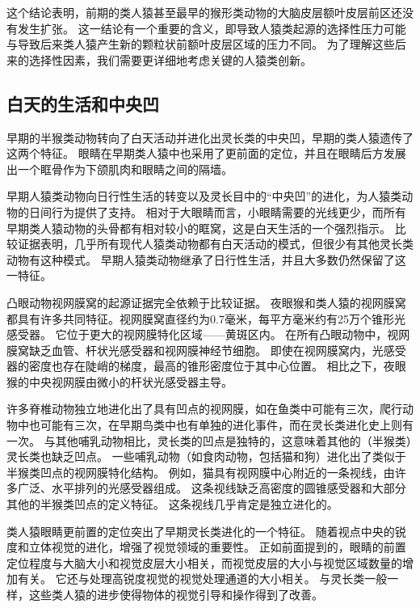 这个结论表明，前期的类人猿甚至最早的猴形类动物的大脑皮层额叶皮层前区还没有发生扩张。
这一结论有一个重要的含义，即导致人猿类起源的选择性压力可能与导致后来类人猿产生新的颗粒状前额叶皮层区域的压力不同。
为了理解这些后来的选择性因素，我们需要更详细地考虑关键的人猿类创新。



\subsection{白天的生活和中央凹}

早期的半猴类动物转向了白天活动并进化出灵长类的中央凹，早期的类人猿遗传了这两个特征。
眼睛在早期类人猿中也采用了更前面的定位，并且在眼睛后方发展出一个眶骨作为下颌肌肉和眼睛之间的隔墙。


早期人猿类动物向日行性生活的转变以及灵长目中的“中央凹”的进化，为人猿类动物的日间行为提供了支持。
相对于大眼睛而言，小眼睛需要的光线更少，而所有早期类人猿动物的头骨都有相对较小的眶窝，这是白天生活的一个强烈指示\cite{fleagle2024primate}。
比较证据表明，几乎所有现代人猿类动物都有白天活动的模式，但很少有其他灵长类动物有这种模式\cite{heesy2004mosaic}。
早期人猿类动物继承了日行性生活，并且大多数仍然保留了这一特征。


凸眼动物视网膜窝的起源证据完全依赖于比较证据。
夜眼猴和类人猿的视网膜窝都具有许多共同特征。视网膜窝直径约为0.7毫米，每平方毫米约有25万个锥形光感受器。
它位于更大的视网膜特化区域——黄斑区内。
在所有凸眼动物中，视网膜窝缺乏血管、杆状光感受器和视网膜神经节细胞。
即使在视网膜窝内，光感受器的密度也存在陡峭的梯度，最高的锥形密度位于其中心位置。
相比之下，夜眼猴的中央视网膜由微小的杆状光感受器主导。


许多脊椎动物独立地进化出了具有凹点的视网膜，如在鱼类中可能有三次，爬行动物中也可能有三次，在早期鸟类中也有单独的进化事件，而在灵长类进化史上则有一次\cite{ross2004tarsier}。
与其他哺乳动物相比，灵长类的凹点是独特的，这意味着其他的（半猴类）灵长类也缺乏凹点。
一些哺乳动物（如食肉动物，包括猫和狗）进化出了类似于半猴类凹点的视网膜特化结构。
例如，猫具有视网膜中心附近的一条视线，由许多广泛、水平排列的光感受器组成。
这条视线缺乏高密度的圆锥感受器和大部分其他的半猴类凹点的定义特征\cite{crescitelli1977topography}。
这条视线几乎肯定是独立进化的。


类人猿眼睛更前置的定位突出了早期灵长类进化的一个特征。
随着视点中央的锐度和立体视觉的进化，增强了视觉领域的重要性。
正如前面提到的，眼睛的前置定位程度与大脑大小和视觉皮层大小相关\cite{barton1998visual}，而视觉皮层的大小与视觉区域数量的增加有关\cite{kaas2020evolution}。
它还与处理高锐度视觉的视觉处理通道的大小相关\cite{barton2004binocularity}。
与灵长类一般一样，这些类人猿的进步使得物体的视觉引导和操作得到了改善。


